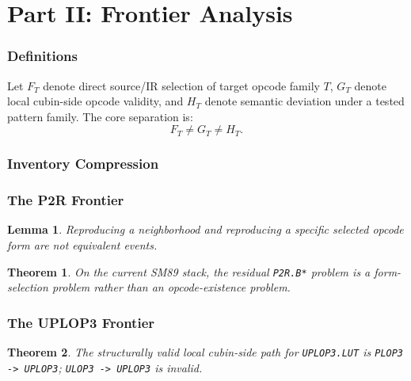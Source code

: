 \documentclass[11pt]{article}
\newtheorem{lemma}{Lemma}
\newtheorem{theorem}{Theorem}
\begin{document}
\part*{Part II: Frontier Analysis}

\section{Definitions}
Let $F_T$ denote direct source/IR selection of target opcode family $T$,
$G_T$ denote local cubin-side opcode validity, and $H_T$ denote semantic
deviation under a tested pattern family. The core separation is:
\[
F_T \neq G_T \neq H_T.
\]

\section{Inventory Compression}
\inventorytable


\section{The P2R Frontier}
\pTwoRTable
\begin{lemma}
Reproducing a neighborhood and reproducing a specific selected opcode form are
not equivalent events.
\end{lemma}

\begin{theorem}
On the current SM89 stack, the residual \texttt{P2R.B*} problem is a
form-selection problem rather than an opcode-existence problem.
\end{theorem}



\section{The UPLOP3 Frontier}
\runtimeclass
{}\livesites
{}\pairbase

\begin{theorem}
The structurally valid local cubin-side path for \texttt{UPLOP3.LUT} is
\texttt{PLOP3 -> UPLOP3}; \texttt{ULOP3 -> UPLOP3} is invalid.
\end{theorem}
\end{document}
